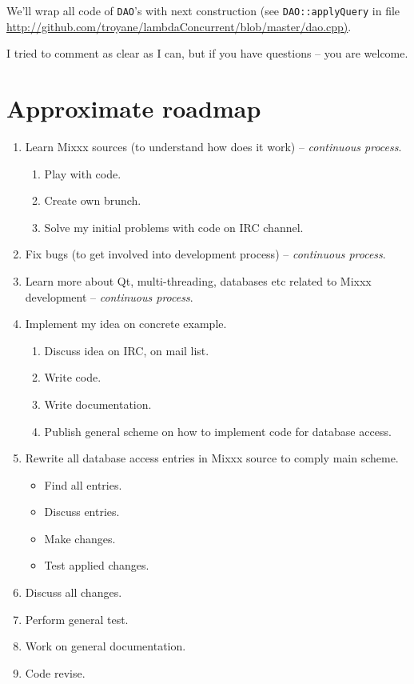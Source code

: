 \documentclass[a4paper,12pt]{scrartcl}
\begin{document}
We'll wrap all code of \texttt{DAO}'s with next construction (see \texttt{DAO::applyQuery} in file \url{http://github.com/troyane/lambdaConcurrent/blob/master/dao.cpp)}.

I tried to comment as clear as I can, but if you have questions -- you are welcome.


\section{Approximate roadmap}
\begin{enumerate}
 \item Learn Mixxx sources (to understand how does it work) -- \textit{continuous process}.
 \begin{enumerate}
  \item Play with code.
  \item Create own brunch.
  \item Solve my initial problems with code on IRC channel.
 \end{enumerate}
 \item Fix bugs (to get involved into development process) -- \textit{continuous process}.
 \item Learn more about Qt, multi-threading, databases etc related to Mixxx development -- \textit{continuous process}.
 \item Implement my idea on concrete example.
 \begin{enumerate}
  \item Discuss idea on IRC, on mail list.
  \item Write code.
  \item Write documentation.
  \item Publish general scheme on how to implement code for database access.
 \end{enumerate}
 \item Rewrite all database access entries in Mixxx source to comply main scheme.
 \begin{itemize}
  \item Find all entries.
  \item Discuss entries.
  \item Make changes.
  \item Test applied changes.
 \end{itemize}
 \item Discuss all changes.
 \item Perform general test.
 \item Work on general documentation.
 \item Code revise.
\end{enumerate}
\end{document}
